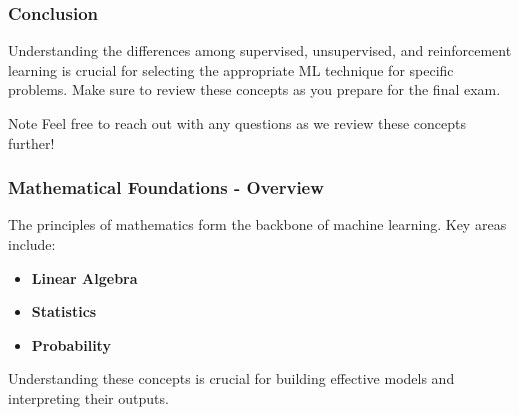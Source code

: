 \documentclass{beamer}
\begin{document}
\begin{frame}[fragile]
    \frametitle{Conclusion}
    Understanding the differences among supervised, unsupervised, and reinforcement learning is crucial for selecting the appropriate ML technique for specific problems. Make sure to review these concepts as you prepare for the final exam.
    
    \begin{block}{Note}
        Feel free to reach out with any questions as we review these concepts further!
    \end{block}
\end{frame}

\begin{frame}[fragile]
    \frametitle{Mathematical Foundations - Overview}
    The principles of mathematics form the backbone of machine learning. Key areas include:
    \begin{itemize}
        \item \textbf{Linear Algebra}
        \item \textbf{Statistics}
        \item \textbf{Probability}
    \end{itemize}
    Understanding these concepts is crucial for building effective models and interpreting their outputs.
\end{frame}
\end{document}
